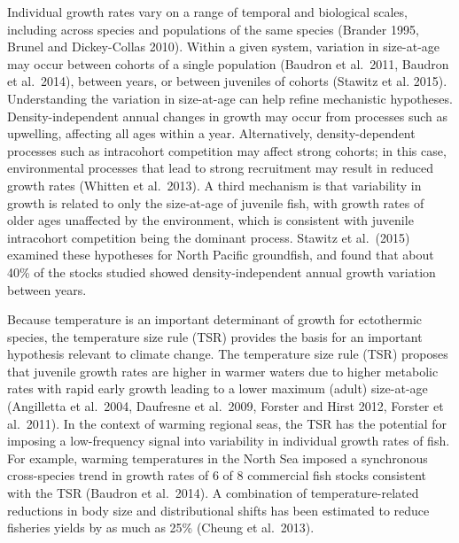 \documentclass[
]{article}
\begin{document}
Individual growth rates vary on a range of temporal and biological
scales, including across species and populations of the same species
(Brander 1995, Brunel and Dickey-Collas 2010). Within a given system,
variation in size-at-age may occur between cohorts of a single
population (Baudron et al.~2011, Baudron et al.~2014), between years, or
between juveniles of cohorts (Stawitz et al. 2015). Understanding the
variation in size-at-age can help refine mechanistic hypotheses.
Density-independent annual changes in growth may occur from processes
such as upwelling, affecting all ages within a year. Alternatively,
density-dependent processes such as intracohort competition may affect
strong cohorts; in this case, environmental processes that lead to
strong recruitment may result in reduced growth rates (Whitten et
al.~2013). A third mechanism is that variability in growth is related to
only the size-at-age of juvenile fish, with growth rates of older ages
unaffected by the environment, which is consistent with juvenile
intracohort competition being the dominant process. Stawitz et
al.~(2015) examined these hypotheses for North Pacific groundfish, and
found that about 40\% of the stocks studied showed density-independent
annual growth variation between years.

Because temperature is an important determinant of growth for
ectothermic species, the temperature size rule (TSR) provides the basis
for an important hypothesis relevant to climate change. The temperature
size rule (TSR) proposes that juvenile growth rates are higher in warmer
waters due to higher metabolic rates with rapid early growth leading to
a lower maximum (adult) size-at-age (Angilletta et al.~2004, Daufresne
et al.~2009, Forster and Hirst 2012, Forster et al.~2011). In the
context of warming regional seas, the TSR has the potential for imposing
a low-frequency signal into variability in individual growth rates of
fish. For example, warming temperatures in the North Sea imposed a
synchronous cross-species trend in growth rates of 6 of 8 commercial
fish stocks consistent with the TSR (Baudron et al.~2014). A combination
of temperature-related reductions in body size and distributional shifts
has been estimated to reduce fisheries yields by as much as 25\% (Cheung
et al.~2013).
\end{document}
